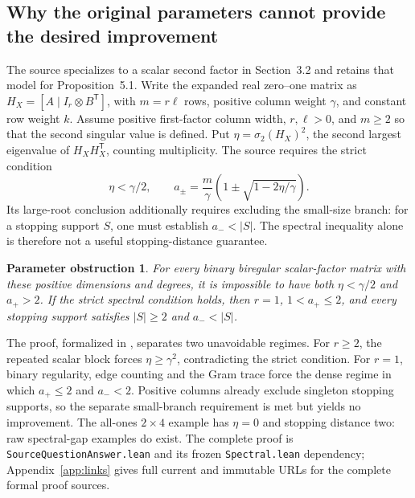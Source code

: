 \documentclass[11pt]{article}
\newtheorem*{priorresult}{Parameter obstruction}
\begin{document}
\subsection{Why the original parameters cannot provide the desired improvement}
The source specializes to a scalar second factor in Section~3.2 and retains that
model for Proposition~5.1. Write the expanded real zero--one matrix as
$H_X=[A\mid I_r\otimes B^{\mathsf T}]$, with $m=r\ell$ rows,
positive column weight $\gamma$, and constant row weight $k$.
Assume positive first-factor column width, $r,\ell>0$, and $m\ge2$ so that
the second singular value is defined. Put $\eta=\sigma_2(H_X)^2$, the second
largest eigenvalue of $H_XH_X^{\mathsf T}$, counting multiplicity. The source
requires the strict condition
\[
 \eta<\gamma/2,
 \qquad a_\pm=\frac m\gamma\left(1\pm\sqrt{1-2\eta/\gamma}\right).
\]
Its large-root conclusion additionally requires excluding the small-size branch:
for a stopping support $S$, one must establish $a_-<|S|$. The spectral inequality
alone is therefore not a useful stopping-distance guarantee.

\begin{priorresult}
For every binary biregular scalar-factor matrix with these positive dimensions
and degrees, it is impossible to have both $\eta<\gamma/2$ and $a_+>2$.
If the strict spectral condition holds, then $r=1$, $1<a_+\le2$, and every
stopping support satisfies $|S|\ge2$ and $a_-<|S|$.
\end{priorresult}

The proof, formalized in \cite{ref7}, separates two unavoidable regimes. For $r\ge2$, the
repeated scalar block forces $\eta\ge\gamma^2$, contradicting the strict
condition. For $r=1$, binary regularity, edge counting and the Gram trace force
the dense regime in which $a_+\le2$ and $a_-<2$. Positive columns already exclude
singleton stopping supports, so the separate small-branch requirement is met
but yields no improvement. The all-ones $2\times4$ example has $\eta=0$ and
stopping distance two: raw spectral-gap examples do exist.
The complete proof is \texttt{SourceQuestionAnswer.lean} and its frozen
\texttt{Spectral.lean} dependency; Appendix~\ref{app:links} gives full current
and immutable URLs for the complete formal proof sources.
\end{document}
